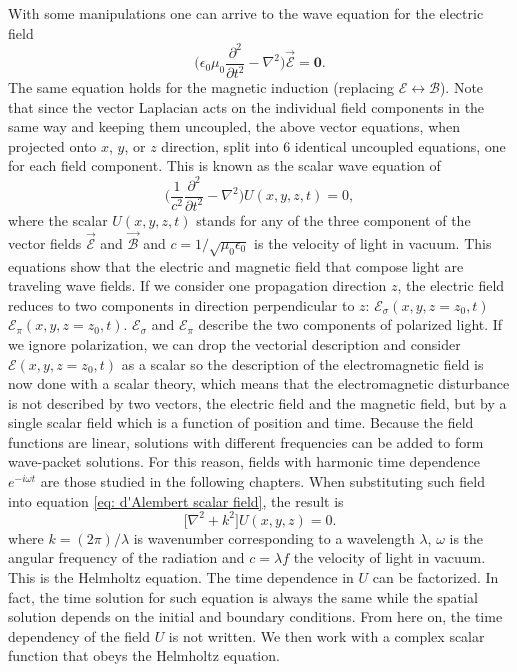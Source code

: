 \documentclass{iucr}              %
\begin{document}
With some manipulations one can arrive to the wave equation for the electric field
\begin{equation}\label{eq: d'Alembert electric field}
	\Big(\epsilon_0 \mu_0 \frac{\partial^2}{\partial t^2}-\nabla^2\Big) \vec{\mathcal{E}} = \bm{0}.
\end{equation}
The same equation holds for the magnetic induction (replacing $\mathcal{E} \longleftrightarrow \mathcal{B}$). 
Note that since the vector Laplacian acts on the individual field components in the same way and keeping them uncoupled, the above vector equations, when projected onto $x$, $y$, or $z$ direction, split into 6 identical uncoupled equations, one for each field component.
This is known as the scalar wave equation of
\begin{equation}\label{eq: d'Alembert scalar field}
\Big(\frac{1}{c^2} \frac{\partial^2}{\partial t^2}-\nabla^2\Big) U(x,y,z,t) = 0,
\end{equation}
where the scalar $U(x,y,z,t)$ stands for any of the three component of the vector fields $\vec{\mathcal{E}}$ and $\vec{\mathcal{B}}$ and $c= 1/\sqrt{\mu_0 \epsilon_0}$ is the velocity of light in vacuum. This equations show that the electric and magnetic field that compose light are traveling wave fields. If we consider one propagation direction $z$, the electric field reduces to two components in direction perpendicular to $z$: $\mathcal{E}_\sigma(x,y,z=z_0,t)$ $\mathcal{E}_\pi(x,y,z=z_0,t)$. $\mathcal{E}_\sigma$ and $\mathcal{E}_\pi$ describe the two components of polarized light. If we ignore polarization, we can drop the vectorial description and consider $\mathcal{E}(x,y,z=z_0,t)$ as a scalar so the description of the electromagnetic field is now done with a scalar theory, which means that the electromagnetic disturbance is not described by two vectors, the electric field and the magnetic field, but by a single scalar field which is a function of position and time. Because the field functions are linear, solutions with different frequencies can be added to form wave-packet solutions. For this reason, fields with harmonic time dependence $e^{-i\omega t}$ are those studied in the following chapters. When substituting such field into equation \ref{eq: d'Alembert scalar field}, the result is
\begin{equation}\label{eq: Helmholtz equation}
	\big[\nabla^2 + k^2\big]U(x,y,z)=0.
\end{equation}
where $k= (2\pi)/\lambda$ is wavenumber corresponding to a wavelength $\lambda$, $\omega$ is the angular frequency of the radiation and $c=\lambda f$ the velocity of light in vacuum. This is the Helmholtz equation. The time dependence in $U$ can be factorized. In fact, the time solution for such equation is always the same while the spatial solution depends on the initial and boundary conditions. From here on, the time dependency of the field $U$ is not written. We then work with a complex scalar function that obeys the Helmholtz equation.
\end{document}
